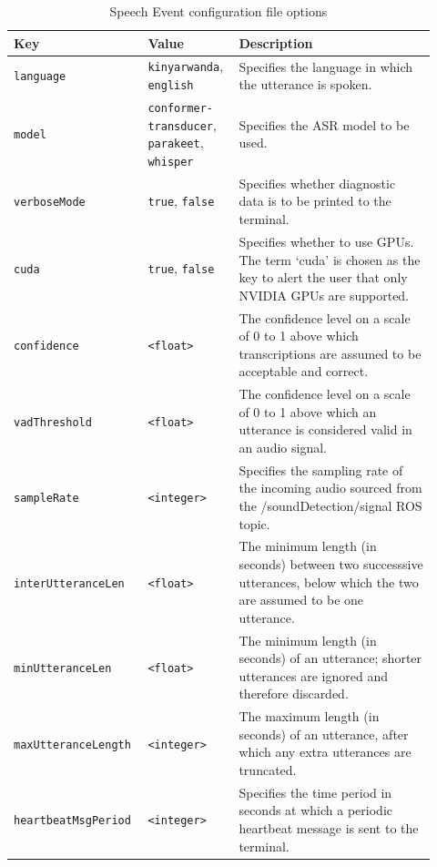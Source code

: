 \documentclass{CSSRforAfrica}
\begin{document}
\begin{center}
\begin{table}[thb]
\begin{tabular}[thb]{|p{0.27\linewidth}|p{0.20\linewidth}|p{0.45\linewidth}|}\hline
\rowcolor{lightgray} Key & Value & Description \\ \hline
\texttt{language} & \texttt{kinyarwanda}, \texttt{english} & Specifies the language in which the utterance is spoken. \\ \hline
\texttt{model} & \texttt{conformer- transducer}, \texttt{parakeet}, \texttt{whisper} & Specifies the ASR model to be used. \\ \hline
\texttt{verboseMode} & \texttt{true}, \texttt{false} & Specifies whether diagnostic data is to be printed to the terminal. \\ \hline
\texttt{cuda} & \texttt{true}, \texttt{false} & Specifies whether to use GPUs. The term ‘cuda’ is chosen as the key to alert the user that only NVIDIA GPUs are supported. \\ \hline
\texttt{confidence} & \texttt{<float>} & The confidence level on a scale of 0 to 1 above which transcriptions are assumed to be acceptable and correct. \\ \hline
\texttt{vadThreshold} & \texttt{<float>} & The confidence level on a scale of 0 to 1 above which an utterance is considered valid in an audio signal. \\ \hline
\texttt{sampleRate} & \texttt{<integer>} & Specifies the sampling rate of the incoming audio sourced from the /soundDetection/signal ROS topic. \\ \hline
\texttt{interUtteranceLen} & \texttt{<float>} & The minimum length (in seconds) between two successsive utterances, below which the two are assumed to be one utterance. \\ \hline
\texttt{minUtteranceLen} & \texttt{<float>} & The minimum length (in seconds) of an utterance; shorter utterances are ignored and therefore discarded. \\ \hline
\texttt{maxUtteranceLength} & \texttt{<integer>} & The maximum length (in seconds) of an utterance, after which any extra utterances are truncated. \\ \hline
\texttt{heartbeatMsgPeriod} & \texttt{<integer>} & Specifies the time period in seconds at which a periodic heartbeat message is sent to the terminal. \\ \hline
\end{tabular}
\caption{Speech Event configuration file options}
\label{table:speechEvent-config-file}
\end{table}
\end{center}
\end{document}
